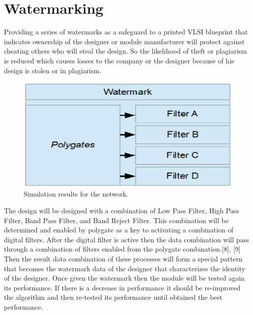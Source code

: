 \documentclass[10pt,journal,compsoc]{IEEEtran}
\begin{document}
\section{Watermarking}
Providing a series of watermarks as a safeguard to a printed VLSI blueprint that indicates ownership of the designer or module manufacturer will protect against cheating others who will steal the design. So the likelihood of theft or plagiarism is reduced which causes losses to the company or the designer because of his design is stolen or in plagiarism.

\begin{figure}[h]
	\centering
	\includegraphics[scale=0.45]{images/box}
	\caption{Simulation results for the network.}
	\label{fig_sim}
\end{figure}

The design will be designed with a combination of Low Pass Filter, High Pass Filter, Band Pass Filter, and Band Reject Filter. This combination will be determined and enabled by polygate as a key to activating a combination of digital filters. After the digital filter is active then the data combination will pass through a combination of filters enabled from the polygate combination.[8], [9] Then the result data combination of these processes will form a special pattern that becomes the watermark data of the designer that characterizes the identity of the designer. Once given the watermark then the module will be tested again its performance. If there is a decrease in performance it should be re-improved the algorithm and then re-tested its performance until obtained the best performance.
\end{document}
